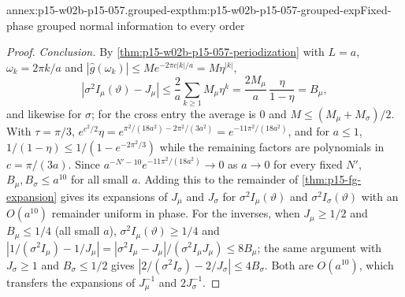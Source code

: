 \begin{annexitem}{annex:p15-w02b-p15-057.grouped-exp}{thm:p15-w02b-p15-057-grouped-exp}{Fixed-phase grouped normal information to every order}
\begin{proof}
\emph{Conclusion.} By \cref{thm:p15-w02b-p15-057-periodization} with
\(L=a\), \(\omega_k=2\pi k/a\) and \(|\widehat g(\omega_k)|\leq
Me^{-2\pi c|k|/a}=M\eta^{|k|}\),
\[
 |\sigma^2I_\mu(\vartheta)-J_\mu|\leq\frac2a\sum_{k\geq1}M_\mu\eta^k
 =\frac{2M_\mu}a\,\frac\eta{1-\eta}=B_\mu,
\]
and likewise for \(\sigma\); for the cross entry the average is \(0\) and
\(M\leq(M_\mu+M_\sigma)/2\). With \(\tau=\pi/3\),
\(e^{c^2/2}\eta=e^{\pi^2/(18a^2)-2\pi^2/(3a^2)}=e^{-11\pi^2/(18a^2)}\), and for
\(a\leq1\), \(1/(1-\eta)\leq1/(1-e^{-2\pi^2/3})\) while the remaining factors
are polynomials in \(c=\pi/(3a)\). Since
\(a^{-N'-10}e^{-11\pi^2/(18a^2)}\to0\) as \(a\to0\) for every fixed
\(N'\), \(B_\mu,B_\sigma\leq a^{10}\) for all small \(a\). Adding this to the remainder of
\cref{thm:p15-fg-expansion} gives its expansions of \(J_\mu\) and
\(J_\sigma\) for \(\sigma^2I_\mu(\vartheta)\) and
\(\sigma^2I_\sigma(\vartheta)\) with an \(O(a^{10})\) remainder uniform in
phase. For the inverses, when \(J_\mu\geq1/2\) and \(B_\mu\leq1/4\) (all
small \(a\)), \(\sigma^2I_\mu(\vartheta)\geq1/4\) and
\(|1/(\sigma^2I_\mu)-1/J_\mu|=|\sigma^2I_\mu-J_\mu|/(\sigma^2I_\mu J_\mu)\leq
8B_\mu\); the same argument with \(J_\sigma\geq1\) and \(B_\sigma\leq1/2\)
gives \(|2/(\sigma^2I_\sigma)-2/J_\sigma|\leq4B_\sigma\). Both are
\(O(a^{10})\), which transfers the expansions of \(J_\mu^{-1}\) and
\(2J_\sigma^{-1}\).
\end{proof}
\end{annexitem}

